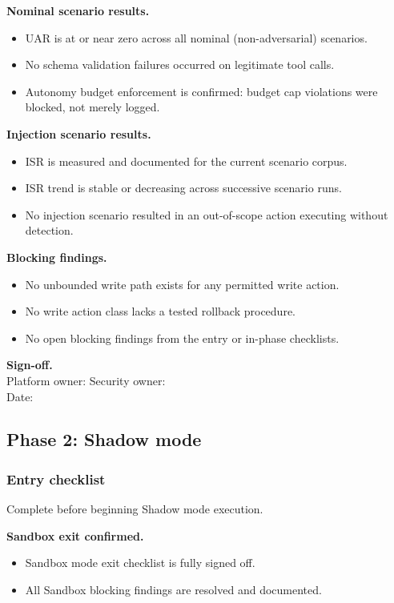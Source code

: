 \documentclass[11pt]{article}
\begin{document}
\textbf{Nominal scenario results.}
\begin{itemize}
  \item UAR is at or near zero across all nominal (non-adversarial) scenarios.
  \item No schema validation failures occurred on legitimate tool calls.
  \item Autonomy budget enforcement is confirmed: budget cap violations were blocked, not merely logged.
\end{itemize}

\textbf{Injection scenario results.}
\begin{itemize}
  \item ISR is measured and documented for the current scenario corpus.
  \item ISR trend is stable or decreasing across successive scenario runs.
  \item No injection scenario resulted in an out-of-scope action executing without detection.
\end{itemize}

\textbf{Blocking findings.}
\begin{itemize}
  \item No unbounded write path exists for any permitted write action.
  \item No write action class lacks a tested rollback procedure.
  \item No open blocking findings from the entry or in-phase checklists.
\end{itemize}

\textbf{Sign-off.}\\Platform owner: \underline{\hspace{1.5in}} \quad Security owner: \underline{\hspace{1.5in}}\\Date: \underline{\hspace{1.5in}}

\subsection{Phase 2: Shadow mode}

\subsubsection{Entry checklist}
Complete before beginning Shadow mode execution.

\textbf{Sandbox exit confirmed.}
\begin{itemize}
  \item Sandbox mode exit checklist is fully signed off.
  \item All Sandbox blocking findings are resolved and documented.
\end{itemize}
\end{document}
